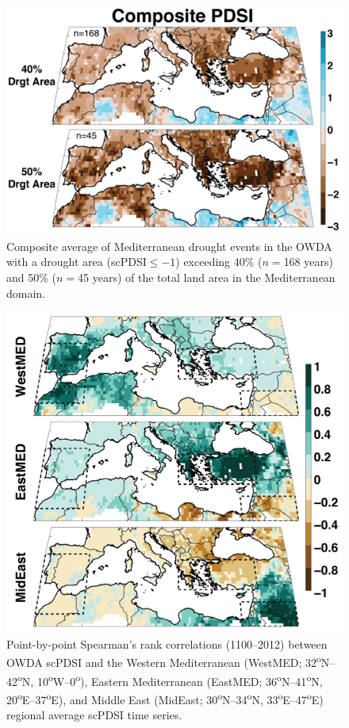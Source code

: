 \documentclass[draft,jgr]{AGUTeX}
\begin{document}
\begin{figure}
\center
\includegraphics[width=0.9\columnwidth]{fig_06_pdsi_40_50_composite.png}
\caption{Composite average of Mediterranean drought events in the OWDA with a drought area (scPDSI$\le-1$) exceeding 40\% ($n=$168 years) and 50\% ($n=$45 years) of the total land area in the Mediterranean domain.}\label{placeholder}
\end{figure}

\begin{figure}
\center
\includegraphics[width=0.9\columnwidth]{fig_07_east_west_mideast_corrmap.png}
\caption{Point-by-point Spearman's rank correlations (1100--2012) between OWDA scPDSI and the Western Mediterranean (WestMED; 32\textsuperscript{o}N--42\textsuperscript{o}N, 10\textsuperscript{o}W--0\textsuperscript{o}), Eastern Mediterranean (EastMED; 36\textsuperscript{o}N--41\textsuperscript{o}N, 20\textsuperscript{o}E--37\textsuperscript{o}E), and Middle East (MidEast; 30\textsuperscript{o}N--34\textsuperscript{o}N, 33\textsuperscript{o}E--47\textsuperscript{o}E) regional average scPDSI time series.}\label{placeholder}
\end{figure}
\end{document}
